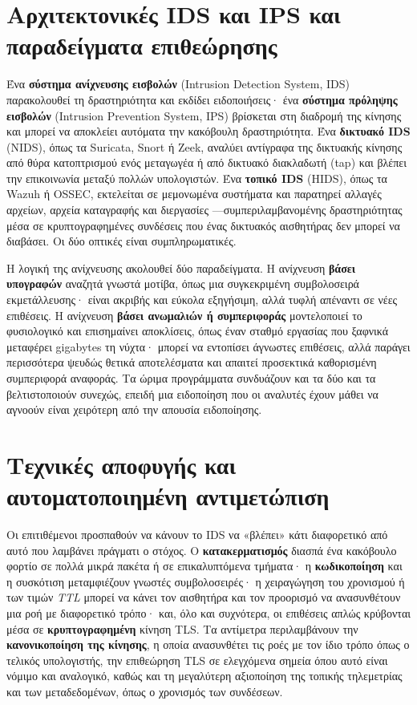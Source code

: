 \section{Αρχιτεκτονικές IDS και IPS και παραδείγματα επιθεώρησης}\label{sec:11.1}
Ένα \textbf{σύστημα ανίχνευσης εισβολών} (Intrusion Detection System, IDS) παρακολουθεί τη δραστηριότητα και εκδίδει ειδοποιήσεις· ένα \textbf{σύστημα πρόληψης εισβολών} (Intrusion Prevention System, IPS) βρίσκεται στη διαδρομή της κίνησης και μπορεί να αποκλείει αυτόματα την κακόβουλη δραστηριότητα. Ένα \textbf{δικτυακό IDS} (NIDS), όπως τα Suricata, Snort ή Zeek, αναλύει αντίγραφα της δικτυακής κίνησης από θύρα κατοπτρισμού ενός μεταγωγέα ή από δικτυακό διακλαδωτή (tap) και βλέπει την επικοινωνία μεταξύ πολλών υπολογιστών. Ένα \textbf{τοπικό IDS} (HIDS), όπως τα Wazuh ή OSSEC, εκτελείται σε μεμονωμένα συστήματα και παρατηρεί αλλαγές αρχείων, αρχεία καταγραφής και διεργασίες —συμπεριλαμβανομένης δραστηριότητας μέσα σε κρυπτογραφημένες συνδέσεις που ένας δικτυακός αισθητήρας δεν μπορεί να διαβάσει. Οι δύο οπτικές είναι συμπληρωματικές.

Η λογική της ανίχνευσης ακολουθεί δύο παραδείγματα. Η ανίχνευση \textbf{βάσει υπογραφών} αναζητά γνωστά μοτίβα, όπως μια συγκεκριμένη συμβολοσειρά εκμετάλλευσης· είναι ακριβής και εύκολα εξηγήσιμη, αλλά τυφλή απέναντι σε νέες επιθέσεις. Η ανίχνευση \textbf{βάσει ανωμαλιών ή συμπεριφοράς} μοντελοποιεί το φυσιολογικό και επισημαίνει αποκλίσεις, όπως έναν σταθμό εργασίας που ξαφνικά μεταφέρει gigabytes τη νύχτα· μπορεί να εντοπίσει άγνωστες επιθέσεις, αλλά παράγει περισσότερα ψευδώς θετικά αποτελέσματα και απαιτεί προσεκτικά καθορισμένη συμπεριφορά αναφοράς. Τα ώριμα προγράμματα συνδυάζουν και τα δύο και τα βελτιστοποιούν συνεχώς, επειδή μια ειδοποίηση που οι αναλυτές έχουν μάθει να αγνοούν είναι χειρότερη από την απουσία ειδοποίησης.

\section{Τεχνικές αποφυγής και αυτοματοποιημένη αντιμετώπιση}\label{sec:11.2}
Οι επιτιθέμενοι προσπαθούν να κάνουν το IDS να «βλέπει» κάτι διαφορετικό από αυτό που λαμβάνει πράγματι ο στόχος. Ο \textbf{κατακερματισμός} διασπά ένα κακόβουλο φορτίο σε πολλά μικρά πακέτα ή σε επικαλυπτόμενα τμήματα· η \textbf{κωδικοποίηση} και η συσκότιση μεταμφιέζουν γνωστές συμβολοσειρές· η χειραγώγηση του χρονισμού ή των τιμών \emph{TTL} μπορεί να κάνει τον αισθητήρα και τον προορισμό να ανασυνθέτουν μια ροή με διαφορετικό τρόπο· και, όλο και συχνότερα, οι επιθέσεις απλώς κρύβονται μέσα σε \textbf{κρυπτογραφημένη} κίνηση TLS. Τα αντίμετρα περιλαμβάνουν την \textbf{κανονικοποίηση της κίνησης}, η οποία ανασυνθέτει τις ροές με τον ίδιο τρόπο όπως ο τελικός υπολογιστής, την επιθεώρηση TLS σε ελεγχόμενα σημεία όπου αυτό είναι νόμιμο και αναλογικό, καθώς και τη μεγαλύτερη αξιοποίηση της τοπικής τηλεμετρίας και των μεταδεδομένων, όπως ο χρονισμός των συνδέσεων.

